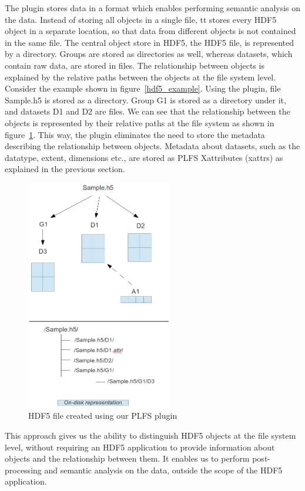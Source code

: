 The plugin stores data in a format which enables performing semantic analysis on the data. 
Instead of storing all objects in a single file, tt stores every HDF5 object in a separate location, so that data from different objects is not contained in the same file. 
The central object store in HDF5, the HDF5 file, is represented by a directory. Groups are stored as directories as well, whereas datasets, which contain raw data, are stored in files. 
The relationship between objects is explained by the relative paths between the objects at the file system level. Consider the example shown in figure~\ref{hdf5_example}. Using the plugin, file Sample.h5 is stored as a directory. Group G1 is stored as a directory under it, and datasets D1 and D2 are files. We can see that the relationship between the objects is represented by their relative paths at the file system as shown in figure~\ref{hdf5_example_plugin}. This way, the plugin eliminates the need to store the metadata describing the relationship between objects. Metadata about datasets, such as the datatype, extent, dimensions etc., are stored as PLFS Xattributes (xattrs) as explained in the previous section. 
\begin{figure}[!t]
\centering
\includegraphics[width=2.5in]{hdf5_example_plugin}
\caption{HDF5 file created using our PLFS plugin}
\label{hdf5_example_plugin}
\end{figure}

This approach gives us the ability to distinguish HDF5 objects at the file system level, without requiring an HDF5 application to provide information about objects and the relationship between them. 
It enables us to perform post-processing and semantic analysis on the data, outside the scope of the HDF5 application. 

